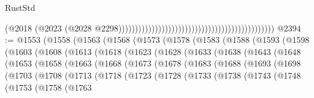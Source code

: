 \begin{lexlean}{RustStd}
\begin{coremodule}
                                                                                            (@2018
                                                                                              (@2023
                                                                                                (@2028
                                                                                                  @2298)))))))))))))))))))))))))))))))))))))))))))))))
@2394 := @1553
    (@1558
      (@1563
        (@1568
          (@1573
            (@1578
              (@1583
                (@1588
                  (@1593
                    (@1598
                      (@1603
                        (@1608
                          (@1613
                            (@1618
                              (@1623
                                (@1628
                                  (@1633
                                    (@1638
                                      (@1643
                                        (@1648
                                          (@1653
                                            (@1658
                                              (@1663
                                                (@1668
                                                  (@1673
                                                    (@1678
                                                      (@1683
                                                        (@1688
                                                          (@1693
                                                            (@1698
                                                              (@1703
                                                                (@1708
                                                                  (@1713
                                                                    (@1718
                                                                      (@1723
                                                                        (@1728
                                                                          (@1733
                                                                            (@1738
                                                                              (@1743
                                                                                (@1748
                                                                                  (@1753
                                                                                    (@1758
                                                                                      (@1763

\end{coremodule}
\end{lexlean}
